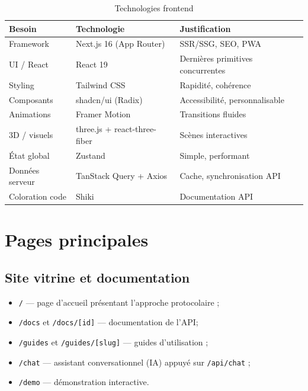 \documentclass[12pt,a4paper]{report}
\theoremstyle{definition}
\theoremstyle{remark}
\newcommand{\api}{\textsc{API}}
\begin{document}
\begin{table}[h]
	\centering
	\caption{Technologies frontend}
	\label{tab:frontend}
	\begin{tabularx}{\textwidth}{llX}
		\toprule
		\textbf{Besoin} & \textbf{Technologie} & \textbf{Justification} \\
		\midrule
		Framework & Next.js 16 (App Router) & SSR/SSG, SEO, PWA \\
		UI / React & React 19 & Dernières primitives concurrentes \\
		Styling & Tailwind CSS & Rapidité, cohérence \\
		Composants & shadcn/ui (Radix) & Accessibilité, personnalisable \\
		Animations & Framer Motion & Transitions fluides \\
		3D / visuels & three.js + react-three-fiber & Scènes interactives \\
		État global & Zustand & Simple, performant \\
		Données serveur & TanStack Query + Axios & Cache, synchronisation \api \\
		Coloration code & Shiki & Documentation \api \\
		\bottomrule
	\end{tabularx}
\end{table}

\section{Pages principales}

\subsection{Site vitrine et documentation}
\begin{itemize}
	\item \texttt{/} — page d'accueil présentant l'approche protocolaire ;
	\item \texttt{/docs} et \texttt{/docs/[id]} — documentation de l'\api ;
	\item \texttt{/guides} et \texttt{/guides/[slug]} — guides d'utilisation ;
	\item \texttt{/chat} — assistant conversationnel (IA) appuyé sur \texttt{/api/chat} ;
	\item \texttt{/demo} — démonstration interactive.
\end{itemize}
\end{document}
